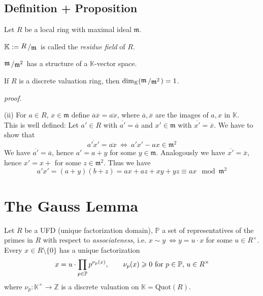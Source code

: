 \documentclass[12pt]{book}
\newcommand{\slant}[2]{{\raisebox{.1em}{$#1$}\left/\raisebox{-.1em}{$#2$}\right.}}
\begin{document}
\begin{spacing}{1.3}
\subsection{Definition + Proposition} %
Let $R$ be a local ring with maximal ideal $\mathfrak{m}$. 
\begin{compactenum}
\item $\mathbb{K}:= \slant{R}{\mathfrak{m}}$ is called the \textit{residue field} of $R$.
\item $\slant{\mathfrak{m}}{\mathfrak{m}^2}$ has a structure of a $\mathbb{K}$-vector space.
\item If $R$ is a discrete valuation ring, then $\dim_{\mathbb{K}}(\slant{\mathfrak{m}}{\mathfrak{m}^2})=1$.
\end{compactenum}
\pagebreak 
\textit{proof.}
\begin{compactenum}
\item[(ii)] For $a \in R$, $x \in \mathfrak{m}$ define $\overline{a} \overline{x}=\overline{ax}$, where $\overline{a}, \overline{x}$ are the images of $a,x$ in $\mathbb{K}$.\\
This is well defined: Let $a' \in R$ with $\overline{a'}=\overline{a}$ and $x'\in \mathfrak{m}$ with $\overline{x'}=\overline{x}$. We have to show that $$\overline{a'x'}=\overline{ax} \ \Longleftrightarrow \ a'x' - ax \in \mathfrak{m}^2$$
We have $\overline{a'}=\overline{a}$, hence $a'=a+y$ for some $y \in \mathfrak{m}$. Analogously we have $\overline{x'}=\overline{x}$, hence $x'=x+$ for some $z \in \mathfrak{m}^2$. Thus we have
$$a'x'=(a+y)(b+z)=ax+az+xy+yz \equiv ax \mod \mathfrak{m}^2$$
\end{compactenum}



\renewcommand*\thesection{§ \arabic{section}\quad}
\section{The Gauss Lemma}
\renewcommand*\thesection{\arabic{section}}

Let $R$ be a UFD (unique factorization domain), $\mathbb{P}$ a set of representatives of the primes in $R$ with respect to \textit{associateness}, i.e. $x \sim y \ \Leftrightarrow y=u\cdot x$ for some $u \in R^{\times}$.\\
Every $x \in R\setminus \{0\}$ has a unique factorization 
$$x=u \cdot \prod_{p \in \mathbb{P}} p^{\nu_p(x)}, \qquad  \nu_p(x) \geqslant 0 \textrm{ for } p \in \mathbb{P} \textrm, \ u \in R^{\times} $$
where $\nu_p: \mathbb{K}^{\times} \longrightarrow \mathbb{Z}$ is a discrete valuation on $\mathbb{K}=\textrm{Quot}(R)$.


\end{spacing}
\end{document}
